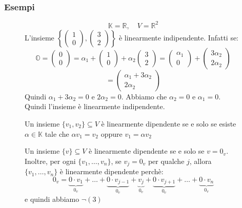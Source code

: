 \documentclass[a4paper]{article}
\theoremstyle{break}
\theoremstyle{break}
\theoremstyle{break}
\theoremstyle{break}
\begin{document}
\subsubsection{Esempi}
\begin{figure}[H]
  \begin{example}
    \[
    \mathbb{K} = \mathbb{R}, \quad V = \mathbb{R}^2
    \] 
    L'insieme \( \left\{ \begin{pmatrix} 
        1\\0
    \end{pmatrix},
    \begin{pmatrix} 
      3\\2
    \end{pmatrix} 
  \right\}  \) è linearmente indipendente. Infatti se:
  \[
  \mathbb{O} = \begin{pmatrix} 0\\0 \end{pmatrix} = \alpha_1 + \begin{pmatrix} 1\\0 \end{pmatrix} 
  + \alpha_2 \begin{pmatrix} 3\\2 \end{pmatrix}
  = \begin{pmatrix} \alpha_1\\0 \end{pmatrix} 
  +
  \begin{pmatrix} 3 \alpha_2\\ 2 \alpha_2 \end{pmatrix} 
  \] 
  \[
  = \begin{pmatrix} 
    \alpha_1 + 3 \alpha_2\\
    2 \alpha_2
  \end{pmatrix} 
  \] 
  Quindi \( \alpha_1 + 3 \alpha_2 = 0 \) e \( 2 \alpha_2 = 0 \). Abbiamo che \( \alpha_2 = 0 \) e
  \( \alpha_1 = 0 \). Quindi l'insieme è linearmente indipendente.
  \end{example}
\end{figure}
\begin{figure}[H]
  \begin{example}
    Un insieme \( \{v_1, v_2\} \subseteq V \) è linearmente dipendente se e solo se esiste
    \( \alpha \in \mathbb{K} \) tale che \( \alpha v_1 = v_2 \) oppure
    \( v_1 = \alpha v_2 \) 
  \end{example}
\end{figure}
\begin{figure}[H]
  \begin{example}
    Un insieme \( \{v\} \subseteq V \) è linearmente dipendente se e solo se \( v = 0_v \).
    Inoltre, per ogni \( \{v_1, \ldots, v_n\}  \), se \( v_j = 0_v \) per qualche \( j \),
    allora \( \{v_1, \ldots, v_n\}  \) è linearmente dipendente perchè:
    \[
    0_v = \underbrace{0 \cdot v_1}_{0_v} + \ldots + \underbrace{0 \cdot v_{j-1}}_{0_v} +
    \underbrace{v_j}_{0_v} + \underbrace{0 \cdot v_{j+1}}_{0_v} + \ldots +
    \underbrace{0 \cdot v_n}_{0_v}
    \] 
    e quindi abbiamo \( \neg (3) \) 
  \end{example}
\end{figure}
\end{document}
